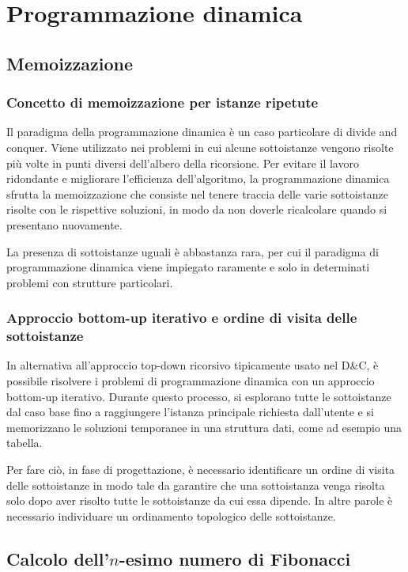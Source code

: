 \section{Programmazione dinamica}
\subsection{Memoizzazione}
\subsubsection*{Concetto di memoizzazione per istanze ripetute}
Il paradigma della programmazione dinamica è un caso particolare di divide and conquer. Viene utilizzato nei problemi in cui
alcune sottoistanze vengono risolte più volte in punti diversi dell'albero della ricorsione. Per evitare il lavoro ridondante
e migliorare l'efficienza dell'algoritmo, la programmazione dinamica sfrutta la memoizzazione che consiste nel tenere traccia
delle varie sottoistanze risolte con le rispettive soluzioni, in modo da non doverle ricalcolare quando si presentano nuovamente.

La presenza di sottoistanze uguali è abbastanza rara, per cui il paradigma di programmazione dinamica viene impiegato
raramente e solo in determinati problemi con strutture particolari.

\subsubsection*{Approccio bottom-up iterativo e ordine di visita delle sottoistanze}
In alternativa all'approccio top-down ricorsivo tipicamente usato nel D\&C, è possibile risolvere i problemi di programmazione
dinamica con un approccio bottom-up iterativo. Durante questo processo, si esplorano tutte le sottoistanze dal caso base fino
a raggiungere l'istanza principale richiesta dall'utente e si memorizzano le soluzioni temporanee in una struttura dati, come
ad esempio una tabella.

Per fare ciò, in fase di progettazione, è necessario identificare un ordine di visita delle sottoistanze in modo tale da
garantire che una sottoistanza venga risolta solo dopo aver risolto tutte le sottoistanze da cui essa dipende. In altre
parole è necessario individuare un ordinamento topologico delle sottoistanze.

\subsection{Calcolo dell'\texorpdfstring{\(n\)}{n}-esimo numero di Fibonacci}
